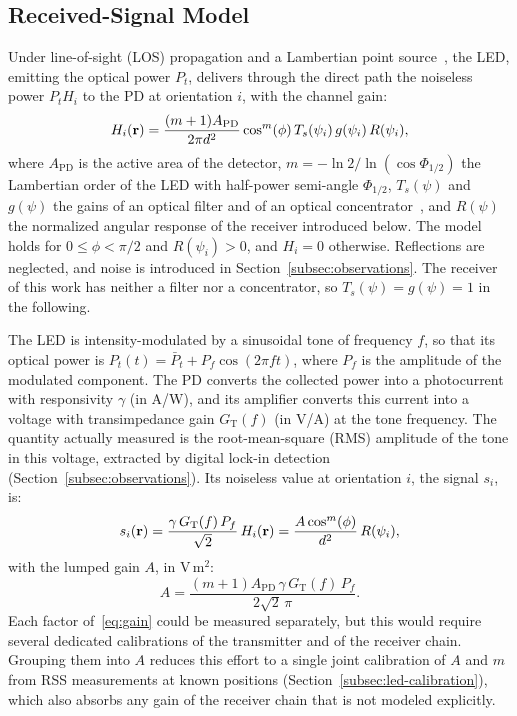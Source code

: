 \subsection{Received-Signal Model}
\label{subsec:radiometry}
Under line-of-sight (LOS) propagation and a Lambertian point source~\cite{Kahn1997,Komine2004}, the LED, emitting the optical power $P_t$, delivers through the direct path the noiseless power $P_tH_i$ to the PD at orientation $i$, with the channel gain:
\begin{equation}
 H_i(\mathbf{r})=\frac{(m+1)A_{\mathrm{PD}}}{2\pi d^2}\cos^{m}(\phi)\,T_s(\psi_i)\,g(\psi_i)\,R(\psi_i),
 \label{eq:channel}
\end{equation}
where $A_{\mathrm{PD}}$ is the active area of the detector, $m=-\ln2/\ln(\cos\Phi_{1/2})$ the Lambertian order of the LED with half-power semi-angle $\Phi_{1/2}$, $T_s(\psi)$ and $g(\psi)$ the gains of an optical filter and of an optical concentrator~\cite{Kahn1997}, and $R(\psi)$ the normalized angular response of the receiver introduced below. The model holds for $0\le\phi<\pi/2$ and $R(\psi_i)>0$, and $H_i=0$ otherwise. Reflections are neglected, and noise is introduced in Section~\ref{subsec:observations}. The receiver of this work has neither a filter nor a concentrator, so $T_s(\psi)=g(\psi)=1$ in the following.

The LED is intensity-modulated by a sinusoidal tone of frequency $f$, so that its optical power is $P_t(t)=\bar P_t+P_f\cos(2\pi ft)$, where $P_f$ is the amplitude of the modulated component. The PD converts the collected power into a photocurrent with responsivity $\gamma$ (in A/W), and its amplifier converts this current into a voltage with transimpedance gain $G_{\mathrm T}(f)$ (in V/A) at the tone frequency. The quantity actually measured is the root-mean-square (RMS) amplitude of the tone in this voltage, extracted by digital lock-in detection (Section~\ref{subsec:observations}). Its noiseless value at orientation $i$, the signal $s_i$, is:
\begin{equation}
 s_i(\mathbf{r})=\frac{\gamma\,G_{\mathrm T}(f)\,P_f}{\sqrt2}\,H_i(\mathbf{r})
 =\frac{A\cos^{m}(\phi)}{d^2}\,R(\psi_i),
 \label{eq:rss-model}
\end{equation}
with the lumped gain $A$, in $\mathrm{V\,m^2}$:
\begin{equation}
 A=\frac{(m+1)A_{\mathrm{PD}}\,\gamma\,G_{\mathrm T}(f)\,P_f}{2\sqrt2\,\pi}.
 \label{eq:gain}
\end{equation}
Each factor of~\eqref{eq:gain} could be measured separately, but this would require several dedicated calibrations of the transmitter and of the receiver chain. Grouping them into $A$ reduces this effort to a single joint calibration of $A$ and $m$ from RSS measurements at known positions (Section~\ref{subsec:led-calibration}), which also absorbs any gain of the receiver chain that is not modeled explicitly.

